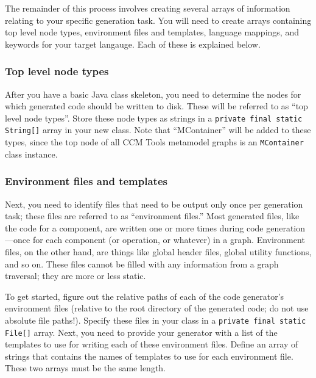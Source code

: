 The remainder of this process involves creating several arrays of information
relating to your specific generation task. You will need to create arrays
containing top level node types, environment files and templates, language
mappings, and keywords for your target langauge. Each of these is explained
below.

\subsubsection{Top level node types}

After you have a basic Java class skeleton, you need to determine the nodes for
which generated code should be written to disk. These will be referred to as
``top level node types''. Store these node types as strings in a {\tt private
final static String[]} array in your new class. Note that ``MContainer'' will be
added to these types, since the top node of all CCM Tools metamodel graphs is an
{\tt MContainer} class instance.

\subsubsection{Environment files and templates}

Next, you need to identify files that need to be output only once per generation
task; these files are referred to as ``environment files.'' Most generated
files, like the code for a component, are written one or more times during code
generation---once for each component (or operation, or whatever) in a graph.
Environment files, on the other hand, are things like global header files,
global utility functions, and so on. These files cannot be filled with any
information from a graph traversal; they are more or less static.

To get started, figure out the relative paths of each of the code generator's
environment files (relative to the root directory of the generated code; do not
use absolute file paths!). Specify these files in your class in a {\tt private
final static File[]} array. Next, you need to provide your generator with a list
of the templates to use for writing each of these environment files. Define an
array of strings that contains the names of templates to use for each
environment file. These two arrays must be the same length.

